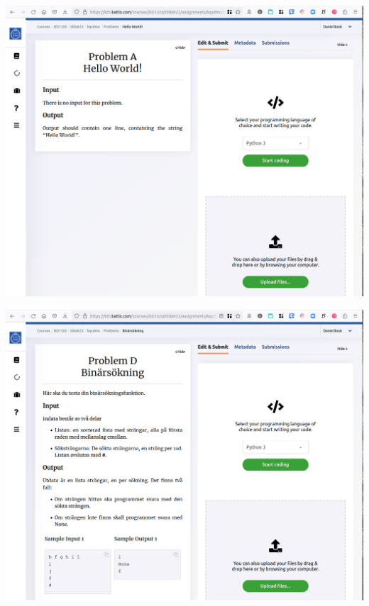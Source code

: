 \begin{frame}[fragile]
  \begin{center}
    \includegraphics[height=0.9\textheight]{figs/kattis-hello.png}
  \end{center}
\end{frame}

\begin{frame}[fragile]
  \begin{center}
    \includegraphics[height=0.9\textheight]{figs/kattis-binary.png}
  \end{center}
\end{frame}


